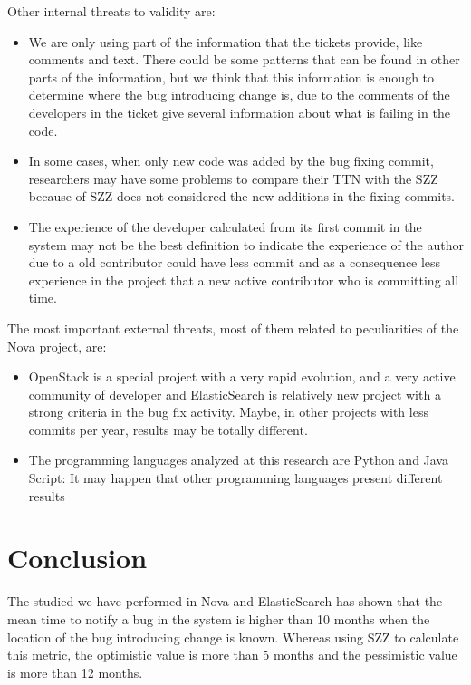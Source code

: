 \documentclass[10pt, conference]{IEEEtran}
\begin{document}
Other internal threats to validity are:
\begin{itemize}
    \item We are only using part of the information that the tickets provide, like comments and text. There could be some patterns that can be found in other parts of the information, but we think that this information is enough to determine where the bug introducing change is, due to the comments of the developers in the ticket give several information about what is failing in the code.
    \item In some cases, when only new code was added by the bug fixing commit, researchers may have some problems to compare their TTN with the SZZ because of SZZ does not considered the new additions in the fixing commits. 
    \item The experience of the developer calculated from its first commit in the system may not be the best definition to indicate the experience of the author due to a old contributor could have less commit and as a consequence less experience in the project that a new active contributor who is committing all time.
\end{itemize}

The most important external threats, most of them related to peculiarities of the Nova project, are:
\begin{itemize}
    \item OpenStack is a special project with a very rapid evolution, and a very active community of developer and ElasticSearch is relatively new project with a strong criteria in the bug fix activity. Maybe, in other projects with less commits per year, results may be totally different.
    \item The programming languages analyzed at this research are Python and Java Script: It may happen that other programming languages present different results
\end{itemize}

\section{Conclusion}
\label{sec:conclusions}

The studied we have performed in Nova and ElasticSearch has shown that the mean time to notify a bug in the system is higher than 10 months when the location of the bug introducing change is known. Whereas using SZZ to calculate this metric, the optimistic value is more than 5 months and the pessimistic value is more than 12 months. 
\end{document}
